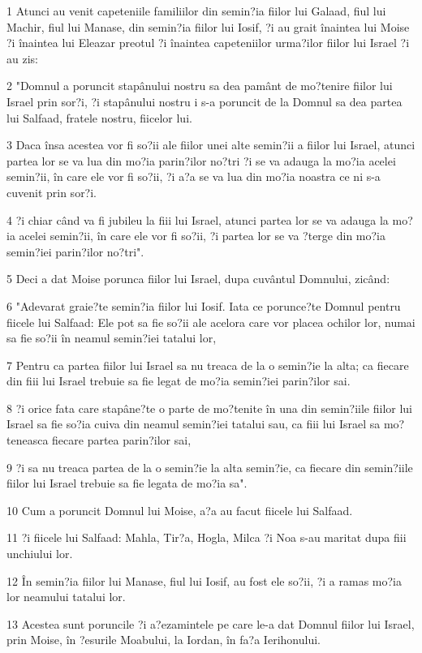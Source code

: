 \par 1 Atunci au venit capeteniile familiilor din semin?ia fiilor lui Galaad, fiul lui Machir, fiul lui Manase, din semin?ia fiilor lui Iosif, ?i au grait înaintea lui Moise ?i înaintea lui Eleazar preotul ?i înaintea capeteniilor urma?ilor fiilor lui Israel ?i au zis:
\par 2 "Domnul a poruncit stapânului nostru sa dea pamânt de mo?tenire fiilor lui Israel prin sor?i, ?i stapânului nostru i s-a poruncit de la Domnul sa dea partea lui Salfaad, fratele nostru, fiicelor lui.
\par 3 Daca însa acestea vor fi so?ii ale fiilor unei alte semin?ii a fiilor lui Israel, atunci partea lor se va lua din mo?ia parin?ilor no?tri ?i se va adauga la mo?ia acelei semin?ii, în care ele vor fi so?ii, ?i a?a se va lua din mo?ia noastra ce ni s-a cuvenit prin sor?i.
\par 4 ?i chiar când va fi jubileu la fiii lui Israel, atunci partea lor se va adauga la mo?ia acelei semin?ii, în care ele vor fi so?ii, ?i partea lor se va ?terge din mo?ia semin?iei parin?ilor no?tri".
\par 5 Deci a dat Moise porunca fiilor lui Israel, dupa cuvântul Domnului, zicând:
\par 6 "Adevarat graie?te semin?ia fiilor lui Iosif. Iata ce porunce?te Domnul pentru fiicele lui Salfaad: Ele pot sa fie so?ii ale acelora care vor placea ochilor lor, numai sa fie so?ii în neamul semin?iei tatalui lor,
\par 7 Pentru ca partea fiilor lui Israel sa nu treaca de la o semin?ie la alta; ca fiecare din fiii lui Israel trebuie sa fie legat de mo?ia semin?iei parin?ilor sai.
\par 8 ?i orice fata care stapâne?te o parte de mo?tenite în una din semin?iile fiilor lui Israel sa fie so?ia cuiva din neamul semin?iei tatalui sau, ca fiii lui Israel sa mo?teneasca fiecare partea parin?ilor sai,
\par 9 ?i sa nu treaca partea de la o semin?ie la alta semin?ie, ca fiecare din semin?iile fiilor lui Israel trebuie sa fie legata de mo?ia sa".
\par 10 Cum a poruncit Domnul lui Moise, a?a au facut fiicele lui Salfaad.
\par 11 ?i fiicele lui Salfaad: Mahla, Tir?a, Hogla, Milca ?i Noa s-au maritat dupa fiii unchiului lor.
\par 12 În semin?ia fiilor lui Manase, fiul lui Iosif, au fost ele so?ii, ?i a ramas mo?ia lor neamului tatalui lor.
\par 13 Acestea sunt poruncile ?i a?ezamintele pe care le-a dat Domnul fiilor lui Israel, prin Moise, în ?esurile Moabului, la Iordan, în fa?a Ierihonului.


